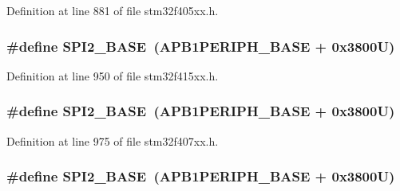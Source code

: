 Definition at line 881 of file stm32f405xx.\+h.

\subsubsection[{\texorpdfstring{S\+P\+I2\+\_\+\+B\+A\+SE}{SPI2_BASE}}]{\setlength{\rightskip}{0pt plus 5cm}\#define S\+P\+I2\+\_\+\+B\+A\+SE~({\bf A\+P\+B1\+P\+E\+R\+I\+P\+H\+\_\+\+B\+A\+SE} + 0x3800\+U)}\hypertarget{group___peripheral__registers__structures_gac3e357b4c25106ed375fb1affab6bb86}{}\label{group___peripheral__registers__structures_gac3e357b4c25106ed375fb1affab6bb86}


Definition at line 950 of file stm32f415xx.\+h.

\subsubsection[{\texorpdfstring{S\+P\+I2\+\_\+\+B\+A\+SE}{SPI2_BASE}}]{\setlength{\rightskip}{0pt plus 5cm}\#define S\+P\+I2\+\_\+\+B\+A\+SE~({\bf A\+P\+B1\+P\+E\+R\+I\+P\+H\+\_\+\+B\+A\+SE} + 0x3800\+U)}\hypertarget{group___peripheral__registers__structures_gac3e357b4c25106ed375fb1affab6bb86}{}\label{group___peripheral__registers__structures_gac3e357b4c25106ed375fb1affab6bb86}


Definition at line 975 of file stm32f407xx.\+h.

\subsubsection[{\texorpdfstring{S\+P\+I2\+\_\+\+B\+A\+SE}{SPI2_BASE}}]{\setlength{\rightskip}{0pt plus 5cm}\#define S\+P\+I2\+\_\+\+B\+A\+SE~({\bf A\+P\+B1\+P\+E\+R\+I\+P\+H\+\_\+\+B\+A\+SE} + 0x3800\+U)}\hypertarget{group___peripheral__registers__structures_gac3e357b4c25106ed375fb1affab6bb86}{}\label{group___peripheral__registers__structures_gac3e357b4c25106ed375fb1affab6bb86}


